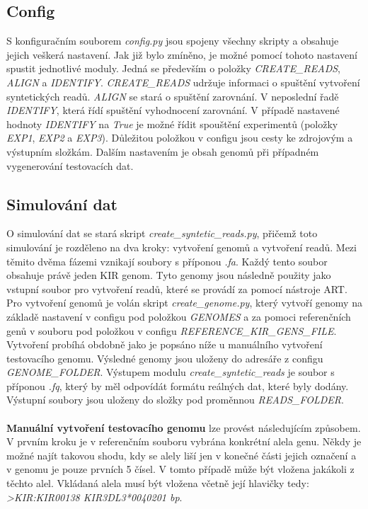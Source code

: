 \documentclass[czech,DP]{thesiskiv}
\numberwithin{equation}{section}
\begin{document}
\subsection{Config}
S konfiguračním souborem \textit{config.py} jsou spojeny všechny skripty a obsahuje jejich veškerá nastavení. Jak již bylo zmíněno, je možné pomocí tohoto nastavení spustit jednotlivé moduly. Jedná se především o položky \textit{CREATE\_READS}, \textit{ALIGN} a \textit{IDENTIFY}. \textit{CREATE\_READS} udržuje informaci o spuštění vytvoření syntetických readů. \textit{ALIGN} se stará o spuštění zarovnání. V neposlední řadě \textit{IDENTIFY}, která řídí spuštění vyhodnocení zarovnání. V případě nastavené hodnoty \textit{IDENTIFY} na \textit{True} je možné řídit spouštění experimentů (položky \textit{EXP1}, \textit{EXP2} a \textit{EXP3}). Důležitou položkou v configu jsou cesty ke zdrojovým a výstupním složkám. Dalším nastavením je obsah genomů při případném vygenerování testovacích dat.


\subsection{Simulování dat}
O simulování dat se stará skript \textit{create\_syntetic\_reads.py}, přičemž toto simulování je rozděleno na dva kroky: vytvoření genomů a vytvoření readů. Mezi těmito dvěma fázemi vznikají soubory s příponou \textit{.fa}. Každý tento soubor obsahuje právě jeden KIR genom. Tyto genomy jsou následně použity jako vstupní soubor pro vytvoření readů, které se provádí za pomocí nástroje ART. Pro vytvoření genomů je volán skript \textit{create\_genome.py}, který vytvoří genomy na základě nastavení v configu pod položkou \textit{GENOMES} a za pomoci referenčních genů v souboru pod položkou v configu \textit{REFERENCE\_KIR\_GENS\_FILE}. Vytvoření probíhá obdobně jako je popsáno níže u manuálního vytvoření testovacího genomu. Výsledné genomy jsou uloženy do adresáře z configu \textit{GENOME\_FOLDER}. Výstupem modulu \textit{create\_syntetic\_reads} je soubor s příponou \textit{.fq}, který by měl odpovídát formátu reálných dat, které byly dodány. Výstupní soubory jsou uloženy do složky pod proměnnou \textit{READS\_FOLDER}.
\\
\\
\textbf{Manuální vytvoření testovacího genomu} lze provést následujícím způsobem. V prvním kroku je v referenčním souboru vybrána konkrétní alela genu. Někdy je možné najít takovou shodu, kdy se alely liší jen v konečné části jejich označení a v genomu je pouze prvních 5 čísel. V tomto případě může být vložena jakákoli z těchto alel. Vkládaná alela musí být vložena včetně její hlavičky tedy: \textit{>KIR:KIR00138 \: KIR3DL3*0040201  \: bp}.
\end{document}
